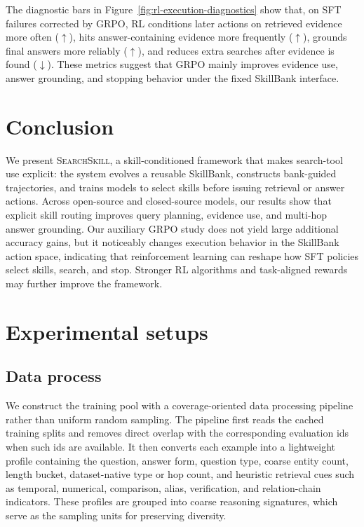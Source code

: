 \documentclass{article}
\newcommand{\Ours}{\textsc{SearchSkill}\xspace}
\begin{document}
The diagnostic bars in Figure~\ref{fig:rl-execution-diagnostics} show that, on SFT failures corrected by GRPO, RL conditions later actions on retrieved evidence more often (\(\uparrow\)), hits answer-containing evidence more frequently (\(\uparrow\)), grounds final answers more reliably (\(\uparrow\)), and reduces extra searches after evidence is found (\(\downarrow\)). These metrics suggest that GRPO mainly improves evidence use, answer grounding, and stopping behavior under the fixed SkillBank interface.
\FloatBarrier

\section{Conclusion}
\label{sec:limitation-conclusion}
\label{sec:limitations-impact}
We present \Ours, a skill-conditioned framework that makes search-tool use explicit: the system evolves a reusable SkillBank, constructs bank-guided trajectories, and trains models to select skills before issuing retrieval or answer actions. Across open-source and closed-source models, our results show that explicit skill routing improves query planning, evidence use, and multi-hop answer grounding. Our auxiliary GRPO study does not yield large additional accuracy gains, but it noticeably changes execution behavior in the SkillBank action space, indicating that reinforcement learning can reshape how SFT policies select skills, search, and stop. Stronger RL algorithms and task-aligned rewards may further improve the framework.




\appendix
\renewcommand{\theHtable}{\thesection.\arabic{table}}
\renewcommand{\theHfigure}{\thesection.\arabic{figure}}
\renewcommand{\theHalgorithm}{\thesection.\arabic{algorithm}}

\section{Experimental setups}
\label{app:experimental-setups}

\subsection{Data process}
\label{app:data-process}

We construct the training pool with a coverage-oriented data processing pipeline rather than uniform random sampling. The pipeline first reads the cached training splits and removes direct overlap with the corresponding evaluation ids when such ids are available. It then converts each example into a lightweight profile containing the question, answer form, question type, coarse entity count, length bucket, dataset-native type or hop count, and heuristic retrieval cues such as temporal, numerical, comparison, alias, verification, and relation-chain indicators. These profiles are grouped into coarse reasoning signatures, which serve as the sampling units for preserving diversity.
\end{document}
